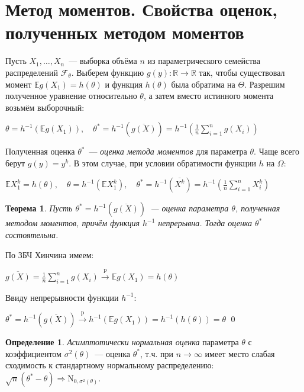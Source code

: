 \documentclass[oneside,final,14pt]{extreport}
\renewenvironment{proof}{{\bfseries Доказательство.}}{\qed}
\newtheorem{thm}{Теорема}[section]
\theoremstyle{definition}
\newtheorem{defn}{Определение}[section]
\begin{document}
\section{Метод моментов. Свойства оценок, полученных методом моментов}

Пусть \(X_1, \ldots, X_n\)~--- выборка объёма \(n\) из параметрического семейства распределений \( \mathcal{F}_\theta \). Выберем функцию \( g(y): \mathbb{R} \rightarrow \mathbb{R} \) так, чтобы существовал момент \( \mathbb{E} g\left(X_{1}\right)=h(\theta) \) и функция \(h(\theta)\) была обратима на \(\Theta\). Разрешим полученное уравнение относительно \(\theta\), а затем вместо истинного момента возьмём выборочный:

\( \theta=h^{-1}\left(\mathbb{E} g\left(X_{1}\right)\right), \quad \theta^{*}=h^{-1}(\overline{g(X)})=h^{-1}\left(\frac{1}{n} \sum_{i=1}^{n} g\left(X_{i}\right)\right) \)

Полученная оценка \(\theta^{*}\)~--- {\it оценка метода моментов} для параметра \(\theta\). Чаще всего берут \(g(y)=y^{k}\). В этом случае, при условии обратимости функции \(h\) на \(\Omega\):

\( \mathbb{E} X_{1}^{k}=h(\theta), \quad \theta=h^{-1}\left(\mathbb{E} X_{1}^{k}\right), \quad \theta^{*}=h^{-1}(\overline{X^{k}})=h^{-1}\left(\frac{1}{n} \sum_{i=1}^{n} X_{i}^{k}\right) \)

\begin{thm}
Пусть \( \theta^{*}=h^{-1}(\overline{g(X)}) \)~--- оценка параметра \(\theta\), полученная методом моментов, причём функция \(h^{-1}\) непрерывна. Тогда оценка \(\theta^{*}\) состоятельна.
\end{thm}

\begin{proof}
По ЗБЧ Хинчина имеем:

\( \overline{g(X)}=\frac{1}{n} \sum_{i=1}^{n} g\left(X_{i}\right) \stackrel{\mathrm{p}}{\longrightarrow} \mathbb{E} g\left(X_{1}\right)=h(\theta) \)

Ввиду непрерывности функции \( h^{-1} \):

\( \theta^{*}=h^{-1}(\overline{g(X)}) \stackrel{\mathrm{p}}{\longrightarrow} h^{-1}\left(\mathbb{E} g\left(X_{1}\right)\right)=h^{-1}(h(\theta))=\theta \)
\end{proof}

\begin{defn}
{\it Асимптотически нормальная оценка} параметра \(\theta\) с коэффициентом \(\sigma^{2}(\theta)\)~--- оценка \(\theta^{*}\), т.ч. при \(n \rightarrow \infty\) имеет место слабая сходимость к стандартному нормальному распределению: \( \sqrt{n}(\theta^{*}-\theta) \Rightarrow \mathrm{N}_{0, \sigma^{2}(\theta)}\).
\end{defn}
\end{document}
